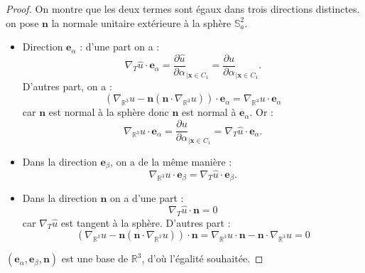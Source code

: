 \begin{proof}
On montre que les deux termes sont égaux dans trois directions distinctes. on pose $\mathbf{n}$ la normale unitaire extérieure à la sphère $\mathbb{S}_a^2$.
\begin{itemize}
\item Direction $\mathbf{e}_{\alpha}$ :
d'une part on a :
\begin{equation}
\nabla_T \hat{u} \cdot \mathbf{e}_{\alpha} = \dfrac{\partial \hat{u}}{\partial \alpha}_{| \mathbf{x} \in C_1}= \dfrac{\partial u}{\partial \alpha}_{| \mathbf{x} \in C_1}.
\end{equation}
D'autres part, on a :
\begin{equation}
\left( \nabla_{\mathbb{R}^3} u - \mathbf{n} \left( \mathbf{n} \cdot \nabla_{\mathbb{R}^3} u \right) \right) \cdot \mathbf{e}_{\alpha} = \nabla_{\mathbb{R}^3} u \cdot \mathbf{e}_{\alpha}
\end{equation}
car $\mathbf{n}$ est normal à la sphère donc $\mathbf{n}$ est normal à $\mathbf{e}_{\alpha}$.
Or :
\begin{equation}
\nabla_{\mathbb{R}^3} u \cdot \mathbf{e}_{\alpha} = \dfrac{\partial u}{\partial \alpha}_{| \mathbf{x} \in C_1} = \nabla_T \hat{u} \cdot \mathbf{e}_{\alpha}.
\end{equation}

\item Dans la direction $\mathbf{e}_{\beta}$, on a de la même manière :
\begin{equation}
\nabla_{\mathbb{R}^3} u \cdot \mathbf{e}_{\beta} = \nabla_T \hat{u} \cdot \mathbf{e}_{\beta}.
\end{equation}

\item Dans la direction $\mathbf{n}$ on a d'une part :
\begin{equation}
\nabla_T \hat{u} \cdot \mathbf{n} = 0 
\end{equation}
car $\nabla_T \hat{u}$ est tangent à la sphère. D'autres part :
\begin{equation}
\left( \nabla_{\mathbb{R}^3} u - \mathbf{n} \left( \mathbf{n} \cdot \nabla_{\mathbb{R}^3} u \right) \right) \cdot \mathbf{n} = \nabla_{\mathbb{R}^3} u \cdot \mathbf{n}- \mathbf{n} \cdot \nabla_{\mathbb{R}^3} u = 0
\end{equation}
\end{itemize}
$(\mathbf{e}_{\alpha}, \mathbf{e}_{\beta}, \mathbf{n})$ est une base de $\mathbb{R}^3$, d'où l'égalité souhaitée.
\end{proof}




















